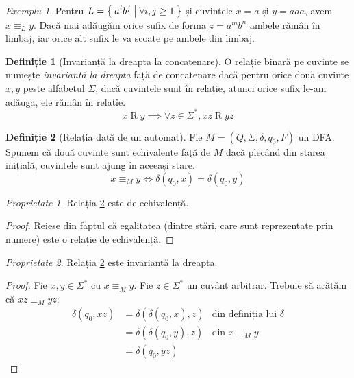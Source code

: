 \documentclass[a4paper, 12pt]{article}
\theoremstyle{definition}
\newtheorem{definition}{Definiție}
\theoremstyle{remark}
\newtheorem*{example}{Exemplu}
\newtheorem*{property}{Proprietate}
\newcommand{\wordequiv}{\operatorname{\equiv}_{L}}
\newcommand{\dfaequiv}[1][M]{\operatorname{\equiv}_{#1}}
\begin{document}
\begin{example}
Pentru \(L = \Set{ a^i b^j | \forall i, j \geq 1 }\) și cuvintele \(x = a\) și \(y = aaa\), avem \(x \wordequiv y\). Dacă mai adăugăm orice sufix de forma \(z = a^m b^n\) ambele rămân în limbaj, iar orice alt sufix le va scoate pe ambele din limbaj.
\end{example}

\begin{definition}[Invarianță la dreapta la concatenare]
O relație binară pe cuvinte se numește \emph{invariantă la dreapta} față de concatenare dacă pentru orice două cuvinte \(x, y\) peste alfabetul \(\Sigma\), dacă cuvintele sunt în relație, atunci orice sufix le-am adăuga, ele rămân în relație.
\[
x \operatorname{R} y \implies \forall z \in \Sigma^*, xz \operatorname{R} yz
\]
\end{definition}

\begin{definition}[Relația dată de un automat]\label{dfaequiv}
Fie \(M = (Q, \Sigma, \delta, q_0, F)\) un DFA. Spunem că două cuvinte sunt echivalente față de \(M\) dacă plecând din starea inițială, cuvintele sunt ajung în aceeași stare.
\[
x \dfaequiv y \iff \delta(q_0, x) = \delta(q_0, y)
\]
\end{definition}

\begin{property}
Relația \ref{dfaequiv} este de echivalență.
\end{property}
\begin{proof}
Reiese din faptul că egalitatea (dintre stări, care sunt reprezentate prin numere) este o relație de echivalență.
\end{proof}

\begin{property}
Relația \ref{dfaequiv} este invariantă la dreapta.
\end{property}
\begin{proof}
Fie \(x, y \in \Sigma^*\) cu \(x \dfaequiv y\). Fie \(z \in \Sigma^*\) un cuvânt arbitrar. Trebuie să arătăm că \(xz \dfaequiv yz\):
\begin{align*}
    \delta(q_0, xz) &= \delta(\delta(q_0, x), z) & \text{din definiția lui } \delta \\
    &= \delta(\delta(q_0, y), z) & \text{din } x \dfaequiv y \\
    &= \delta(q_0, yz)
\end{align*}
\end{proof}
\end{document}
